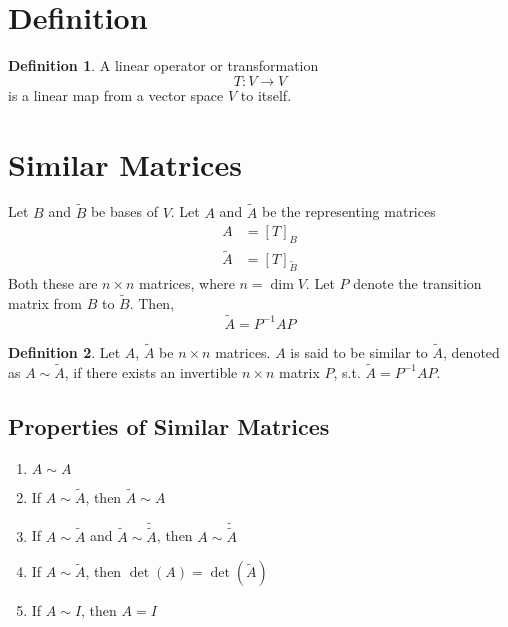 \documentclass[fleqn, a4paper, 12pt]{article}
\theoremstyle{definition}
\newtheorem{definition}{Definition} %
\theoremstyle{theorem}
\theoremstyle{remark}
\numberwithin{equation}{theorem}
\begin{document}
\section{Definition}

\begin{definition}
	A linear operator or transformation
	\begin{equation*}
		T : V \to V
	\end{equation*}
	is a linear map from a vector space $V$ to itself.
\end{definition}

\section{Similar Matrices}

Let $B$ and $\tilde{B}$ be bases of $V$. Let $A$ and $\tilde{A}$ be the representing matrices
\begin{align*}
	A &= [T]_B\\
	\tilde{A} &= [T]_{\tilde{B}}
\end{align*}
Both these are $n \times n$ matrices, where $n = \dim V$. Let $P$ denote the transition matrix from $B$ to $\tilde{B}$. Then,
\begin{equation*}
	\tilde{A} = P^{-1} A P
\end{equation*}

\begin{definition}
	Let $A$, $\tilde{A}$ be $n \times n$ matrices. $A$ is said to be similar to $\tilde{A}$, denoted as $A \sim \tilde{A}$, if there exists an invertible $n \times n$ matrix $P$, s.t. $\tilde{A} = P^{-1} A P$.
\end{definition}

\subsection{Properties of Similar Matrices}

\begin{enumerate}
	\item $A \sim A$ 
	\item If $A \sim \tilde{A}$, then $\tilde{A} \sim A$
	\item If $A \sim \tilde{A}$ and $\tilde{A} \sim \tilde{\tilde{A}}$, then $A \sim \tilde{\tilde{A}}$
	\item If $A \sim \tilde{A}$, then $\det (A) = \det (\tilde{A})$
	\item If $A \sim I$, then $A = I$
\end{enumerate}
\end{document}
